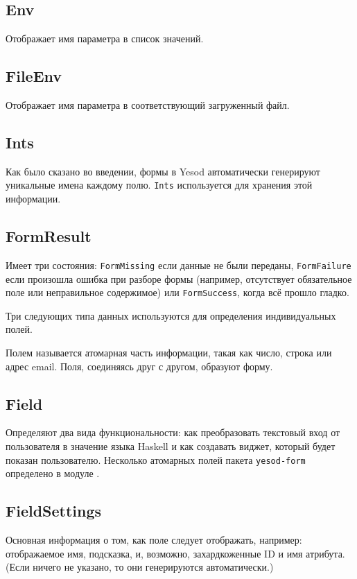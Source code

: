\subsection{Env}
Отображает имя параметра в список значений.

\subsection{FileEnv}
Отображает имя параметра в соответствующий загруженный файл.

\subsection{Ints}
Как было сказано во введении, формы в Yesod автоматически генерируют уникальные имена 
каждому полю. \lstinline'Ints' используется для хранения этой информации.

\subsection{FormResult}
Имеет три состояния: \lstinline'FormMissing' если данные не были переданы,
\lstinline'FormFailure' если произошла ошибка при разборе формы (например, отсутствует
обязательное поле или неправильное содержимое) или \lstinline'FormSuccess', когда всё прошло
гладко.

Три следующих типа данных используются для определения индивидуальных
 полей.

\begin{remark}
Полем называется атомарная часть информации, такая как число, строка или адрес
email. Поля, соединяясь друг с другом, образуют форму.
\end{remark}

\subsection{Field}
Определяют два вида функциональности: как преобразовать текстовый вход от пользователя 
в значение языка Haskell и как создавать виджет, который будет показан пользователю.
Несколько атомарных полей пакета \lstinline'yesod-form' определено в модуле
 .

\subsection{FieldSettings}
Основная информация о том, как поле следует отображать, например: отображаемое имя,
подсказка, и, возможно, захардкоженные ID и имя атрибута. (Если ничего не указано, то они
генерируются автоматически.)

